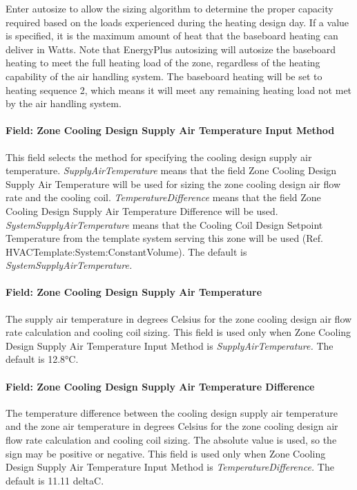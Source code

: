 Enter autosize to allow the sizing algorithm to determine the proper capacity required based on the loads experienced during the heating design day. If a value is specified, it is the maximum amount of heat that the baseboard heating can deliver in Watts. Note that EnergyPlus autosizing will autosize the baseboard heating to meet the full heating load of the zone, regardless of the heating capability of the air handling system. The baseboard heating will be set to heating sequence 2, which means it will meet any remaining heating load not met by the air handling system.

\paragraph{Field: Zone Cooling Design Supply Air Temperature Input Method}\label{field-zone-cooling-design-supply-air-temperature-input-method-9}

This field selects the method for specifying the cooling design supply air temperature. \emph{SupplyAirTemperature} means that the field Zone Cooling Design Supply Air Temperature will be used for sizing the zone cooling design air flow rate and the cooling coil. \emph{TemperatureDifference} means that the field Zone Cooling Design Supply Air Temperature Difference will be used. \emph{SystemSupplyAirTemperature} means that the Cooling Coil Design Setpoint Temperature from the template system serving this zone will be used (Ref. HVACTemplate:System:ConstantVolume). The default is \emph{SystemSupplyAirTemperature.}

\paragraph{Field: Zone Cooling Design Supply Air Temperature}\label{field-zone-cooling-design-supply-air-temperature-8}

The supply air temperature in degrees Celsius for the zone cooling design air flow rate calculation and cooling coil sizing. This field is used only when Zone Cooling Design Supply Air Temperature Input Method is \emph{SupplyAirTemperature.} The default is 12.8°C.

\paragraph{Field: Zone Cooling Design Supply Air Temperature Difference}\label{field-zone-cooling-design-supply-air-temperature-difference-9}

The temperature difference between the cooling design supply air temperature and the zone air temperature in degrees Celsius for the zone cooling design air flow rate calculation and cooling coil sizing. The absolute value is used, so the sign may be positive or negative. This field is used only when Zone Cooling Design Supply Air Temperature Input Method is \emph{TemperatureDifference.} The default is 11.11 deltaC.

